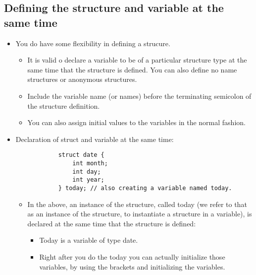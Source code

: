 \subsection{Defining the structure and variable at the same time}
\begin{itemize}
    \item You do have some flexibility in defining a strucure.
        \begin{itemize}
            \item It is valid o declare a variable to be of a particular structure type at the same time that the structure is defined. You can also define no name structures or anonymous structures. 
            \item Include the variable name (or names) before the terminating semicolon of the structure definition. 
            \item You can also assign initial values to the variables in the normal fashion. 
        \end{itemize}
    
    \item Declaration of struct and variable at the same time:
        \begin{verbatim}
            struct date {
                int month;
                int day;
                int year;
            } today; // also creating a variable named today. 
        \end{verbatim}
        \begin{itemize}
            \item In the above, an instance of the structure, called today (we refer to that as an instance of the structure, to instantiate a structure in a variable), is declared at the same time that the structure is defined:
                \begin{itemize}
                    \item Today is a variable of type date. 
                    \item Right after you do the today you can actually initialize those variables, by using the brackets and initializing the variables. 
                \end{itemize}
        \end{itemize}
\end{itemize}

